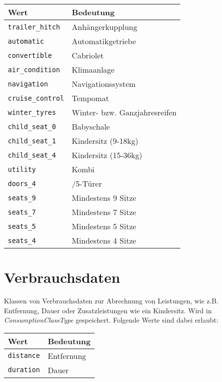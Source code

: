 \begin{flushleft}
\begin{tabularx}{\linewidth}{l>{\raggedright\arraybackslash}X} 
\toprule
Wert & Bedeutung\\
\midrule
\verb|trailer_hitch| & Anhängerkupplung\\
\verb|automatic| & Automatikgetriebe\\
\verb|convertible| & Cabriolet\\
\verb|air_condition| & Klimaanlage\\
\verb|navigation| & Navigationssystem\\
\verb|cruise_control| & Tempomat\\
\verb|winter_tyres| & Winter- bzw. Ganzjahresreifen\\
\verb|child_seat_0| & Babyschale\\
\verb|child_seat_1| & Kindersitz (9-18kg)\\
\verb|child_seat_4| & Kindersitz (15-36kg)\\
\verb|utility| & Kombi\\
\verb|doors_4| & 4/5-Türer\\
\verb|seats_9| & Mindestens 9 Sitze\\
\verb|seats_7| & Mindestens 7 Sitze\\
\verb|seats_5| & Mindestens 5 Sitze\\
\verb|seats_4| & Mindestens 4 Sitze\\
\bottomrule
\end{tabularx}
\end{flushleft}

\section{Verbrauchsdaten}
\label{sec:CodeTabellen:ConsumptionClassType}
Klassen von Verbrauchsdaten zur Abrechnung von Leistungen, wie z.B. Entfernung, Dauer oder Zusatzleistungen wie ein Kindersitz. Wird in  \emph{ConsumptionClassType} gespeichert. Folgende Werte sind dabei erlaubt:

\begin{flushleft}
\begin{tabularx}{\linewidth}{l>{\raggedright\arraybackslash}X} 
\toprule
Wert & Bedeutung\\
\midrule
\verb|distance| & Entfernung\\
\verb|duration| & Dauer\\
\bottomrule
\end{tabularx}
\end{flushleft}

